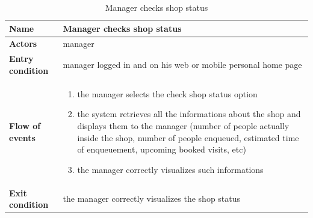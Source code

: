\begin{table}[h!]
    \centering
    \begin{tabular}{@{}P{0.2\textwidth}P{0.70\textwidth}@{}}
        \toprule
        \textbf{Name}                 & Manager checks shop status\\
        \midrule
        \textbf{Actors}               & manager\\
        \textbf{Entry condition}      & manager logged in and on his web or mobile personal home page\\
        \textbf{Flow of events}       & 
        \begin{enumerate}[nolistsep, leftmargin=*]
            \item the manager selects the check shop status option
            \item the system retrieves all the informations about the shop and displays them to the manager (number of people actually inside the shop, number of people enqueued, estimated time of enqueuement, upcoming booked visits, etc)
            \item the manager correctly visualizes such informations
        \end{enumerate} \\
        \textbf{Exit condition}       & the manager correctly visualizes the shop status\\
        \bottomrule
    \end{tabular}
\caption{Manager checks shop status}
\label{table:managerchecksshopstatus}
\end{table}

